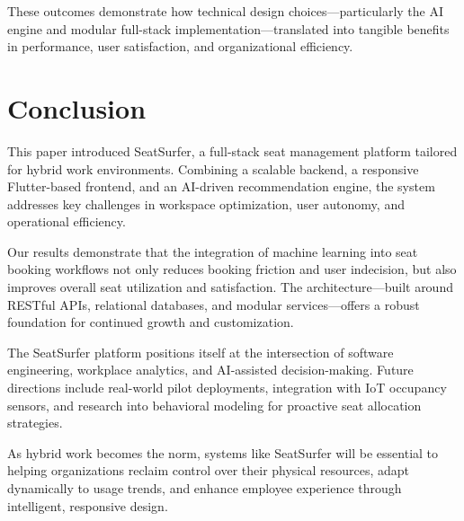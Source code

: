 \documentclass[conference]{IEEEtran}
\begin{document}
These outcomes demonstrate how technical design choices—particularly the AI engine and modular full-stack implementation—translated into tangible benefits in performance, user satisfaction, and organizational efficiency.

\section{Conclusion}

This paper introduced SeatSurfer, a full-stack seat management platform tailored for hybrid work environments. Combining a scalable backend, a responsive Flutter-based frontend, and an AI-driven recommendation engine, the system addresses key challenges in workspace optimization, user autonomy, and operational efficiency.

Our results demonstrate that the integration of machine learning into seat booking workflows not only reduces booking friction and user indecision, but also improves overall seat utilization and satisfaction. The architecture—built around RESTful APIs, relational databases, and modular services—offers a robust foundation for continued growth and customization.

The SeatSurfer platform positions itself at the intersection of software engineering, workplace analytics, and AI-assisted decision-making. Future directions include real-world pilot deployments, integration with IoT occupancy sensors, and research into behavioral modeling for proactive seat allocation strategies.

As hybrid work becomes the norm, systems like SeatSurfer will be essential to helping organizations reclaim control over their physical resources, adapt dynamically to usage trends, and enhance employee experience through intelligent, responsive design.



\end{document}
